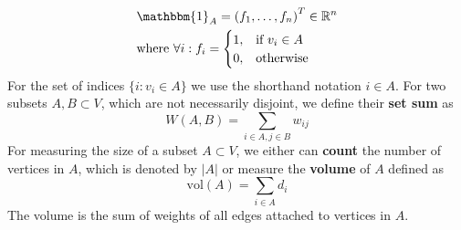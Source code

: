 \begin{equation}
\begin{aligned}
& \mathbbm{1}_A = \left( f_1, \dots, f_n \right)^{T} \in \mathbb{R}^n \\
& \text{where } \forall i: f_i= 
\begin{cases}
    1,& \text{if } v_i\in A\\
    0,              & \text{otherwise}
\end{cases}
\end{aligned}
\end{equation}
For the set of indices $\{ i : v_i \in A \}$ we use the shorthand notation $i \in A$. For two subsets $A, B \subset V$, which are not necessarily disjoint, we define their \textbf{set sum} as
\begin{equation}
	W(A,B) = \sum_{i \in A, j \in B} w_{ij}
\label{eq:set_sum}
\end{equation}
For measuring the size of a subset $A \subset V$, we either can \textbf{count} the number of vertices in $A$, which is denoted by $\left| A \right|$ or measure the \textbf{volume} of $A$ defined as
\begin{equation}
	\text{vol}(A) = \sum_{i \in A} d_i
\label{eq:set_volume}
\end{equation}
The volume is the sum of weights of all edges attached to vertices in $A$.

